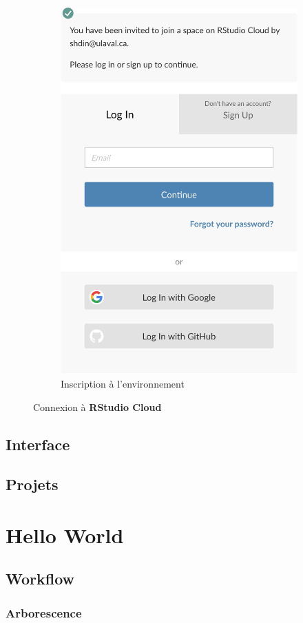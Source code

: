 \documentclass[10.5pt,a4paper]{article}
\begin{document}
\begin{figure}[H]
\begin{subfigure}{.5\textwidth}
  \includegraphics[width=.8\linewidth]{workspace.png}
  \caption{Inscription à l'environnement}
  \label{workspace}
\end{subfigure}
\caption{Connexion à \textbf{RStudio Cloud}}
\label{connexion}
\end{figure}
  
  \subsection{Interface}
  \subsection{Projets}

\section{Hello World}
  \subsection{Workflow}
    \subsubsection{Arborescence}
\end{document}
